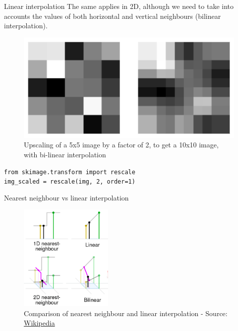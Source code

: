\documentclass[9pt, aspectratio=169]{beamer}
\begin{document}
\begin{frame}
    {Linear interpolation}
    The same applies in 2D, although we need to take into accounts the values of both horizontal and vertical neighbours (bilinear interpolation).
    \begin{figure}
        \centering
        \includegraphics[width=.65\textwidth]{upscaling_lin_interpolation.png}
        \caption{Upscaling of a 5x5 image by a factor of 2, to get a 10x10 image, with bi-linear interpolation}
    \end{figure}

    \begin{codebox}
        \texttt{from skimage.transform import rescale\\
            img\_scaled = rescale(img, 2, order=1)}
    \end{codebox}
\end{frame}

\begin{frame}
    {Nearest neighbour vs linear interpolation}
    \begin{figure}

        \centering
        \includegraphics[width=0.4\textwidth]{interpolation schematics.png}
        \caption{Comparison of nearest neighbour and linear interpolation - Source: \href{https://en.wikipedia.org/wiki/Nearest-neighbor_interpolation}{Wikipedia}}
    \end{figure}
\end{frame}
\end{document}
